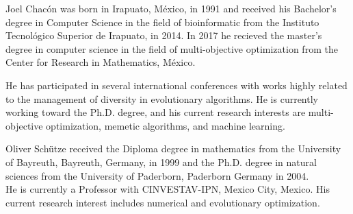 \documentclass[journal]{IEEEtran}
\begin{document}
\begin{IEEEbiography}{Joel Chac\'on}
was born in Irapuato, M\'exico, in 1991 and received his Bachelor's degree in Computer Science in the field of
bioinformatic from the Instituto Tecnol\'ogico Superior de Irapuato, in 2014.
In 2017 he recieved the master's degree in computer science in the field of multi-objective optimization from
the Center for Research in Mathematics, M\'exico.

He has participated in several international conferences with works highly related to the management of diversity
in evolutionary algorithms.
%
He is currently working toward the Ph.D. degree, and his current research interests are multi-objective optimization, 
memetic algorithms, and machine learning.
%
\end{IEEEbiography}

\begin{IEEEbiography}{Oliver Sch\"{u}tze}
received the Diploma degree in mathematics from the University of Bayreuth, Bayreuth, Germany, in 1999 and the Ph.D. degree in natural sciences from the University of Paderborn, Paderborn Germany in 2004.
\\
He is currently a Professor with CINVESTAV-IPN, Mexico City, Mexico.
%
His current research interest includes numerical and evolutionary optimization.
\end{IEEEbiography}
\end{document}
